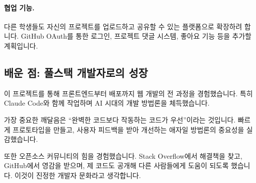 \paragraph{협업 기능.}
다른 학생들도 자신의 프로젝트를 업로드하고 공유할 수 있는 플랫폼으로 확장하려 합니다. GitHub OAuth를 통한 로그인, 프로젝트 댓글 시스템, 좋아요 기능 등을 추가할 계획입니다.

\subsection{배운 점: 풀스택 개발자로의 성장}

이 프로젝트를 통해 프론트엔드부터 배포까지 웹 개발의 전 과정을 경험했습니다. 특히 Claude Code와 함께 작업하며 AI 시대의 개발 방법론을 체득했습니다. 

가장 중요한 깨달음은 ``완벽한 코드보다 작동하는 코드가 우선''이라는 것입니다. 빠르게 프로토타입을 만들고, 사용자 피드백을 받아 개선하는 애자일 방법론의 중요성을 실감했습니다.

또한 오픈소스 커뮤니티의 힘을 경험했습니다. Stack Overflow에서 해결책을 찾고, GitHub에서 영감을 받으며, 제 코드도 공개해 다른 사람들에게 도움이 되도록 했습니다. 이것이 진정한 개발자 문화라고 생각합니다.